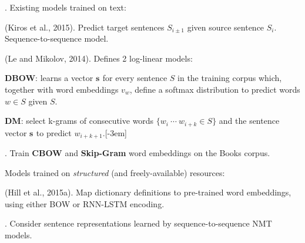 \documentclass[11pt]{article}
\renewcommand\vec[2][]{\bm{#2}_{#1}}
\newcommand\myspace[1][]{\vspace{#1\bigskipamount}}
\newcommand\p{\Needspace{10\baselineskip} \noindent}
\begin{document}
\myspace
\p {}. Existing models trained on text:
\begin{compactitem}
	\item {} (Kiros et al., 2015). Predict target sentences $S_{i \pm 1}$ given source sentence $S_i$. Sequence-to-sequence model.
	 
	\item {} (Le and Mikolov, 2014). Defines 2 log-linear models:
	\begin{compactenum}
		\item \textbf{DBOW}: learns a vector $\vec{s}$ for every sentence $S$ in the training corpus which, together with word embeddings $v_w$, define a softmax distribution to predict words $w \in S$ given $S$. 
		
		\item \textbf{DM}: select k-grams of consecutive words $\{w_i ~ \cdots ~ w_{i + k} \in S \}$ and the sentence vector $\vec{s}$ to predict $w_{i + k + 1}$.
	\end{compactenum}
	
	\item {}. Train \textbf{CBOW} and \textbf{Skip-Gram} word embeddings on the Books corpus.
\end{compactitem}
\vspace{1em}

\p Models trained on \textit{structured} (and freely-available) resources:
\begin{compactitem}
	\item {} (Hill et al., 2015a). Map dictionary definitions to pre-trained word embeddings, using either BOW or RNN-LSTM encoding.
	
	\item {}. Consider sentence representations learned by sequence-to-sequence NMT models.
\end{compactitem}
\end{document}
